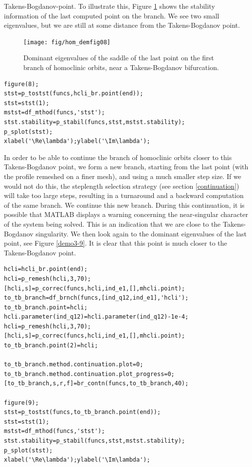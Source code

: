 \documentclass[10pt]{scrartcl}
\renewcommand{\Re}{\operatorname{Re}}
\renewcommand{\Im}{\operatorname{Im}}
\begin{document}
{Takens-Bogdanov-point. To illustrate this, Figure \ref{demo3-8} shows
the stability information of the last computed point on the branch. We
see two small eigenvalues, but we are still at some distance from the
Takens-Bogdanov point.
\begin{figure}
  \begin{center}
    \texttt{[image: fig/hom\_demfig08]}
    \caption{Dominant eigenvalues of the saddle of the last point on the first branch
      of homoclinic orbits,
      near a Takens-Bogdanov bifurcation.\label{demo3-8}}
  \end{center}
\end{figure}
\begin{lstlisting}
figure(8);
stst=p_tostst(funcs,hcli_br.point(end));
stst=stst(1);
mstst=df_mthod(funcs,'stst');
stst.stability=p_stabil(funcs,stst,mstst.stability);
p_splot(stst);
xlabel('\Re\lambda');ylabel('\Im\lambda');  
\end{lstlisting}
In order to be able to continue the branch of homoclinic orbits closer
to this Takens-Bogdanov point, we form a new branch, starting from the
last point (with the profile remeshed on a finer mesh), and using a
much smaller step size.  If we would not do this, the steplength
selection strategy (see section \ref{continuation}) will take too
large steps, resulting in a turnaround and a backward computation of
the same branch.  We continue this new branch.  During this
continuation, it is possible that MATLAB displays a warning concerning
the near-singular character of the system being solved.  This is an
indication that we are close to the Takens-Bogdanov singularity.  We
then look again to the dominant eigenvalues of the last point, see
Figure \ref{demo3-9}.  It is clear that this point is much closer to
the Takens-Bogdanov point.  
\begin{lstlisting}
hcli=hcli_br.point(end);
hcli=p_remesh(hcli,3,70);
[hcli,s]=p_correc(funcs,hcli,ind_e1,[],mhcli.point);
to_tb_branch=df_brnch(funcs,[ind_q12,ind_e1],'hcli');
to_tb_branch.point=hcli;
hcli.parameter(ind_q12)=hcli.parameter(ind_q12)-1e-4;
hcli=p_remesh(hcli,3,70);
[hcli,s]=p_correc(funcs,hcli,ind_e1,[],mhcli.point);
to_tb_branch.point(2)=hcli;

to_tb_branch.method.continuation.plot=0;
to_tb_branch.method.continuation.plot_progress=0;
[to_tb_branch,s,r,f]=br_contn(funcs,to_tb_branch,40);

figure(9);
stst=p_tostst(funcs,to_tb_branch.point(end));
stst=stst(1);
mstst=df_mthod(funcs,'stst');
stst.stability=p_stabil(funcs,stst,mstst.stability);
p_splot(stst);
xlabel('\Re\lambda');ylabel('\Im\lambda');  
\end{lstlisting}

}
\end{document}
